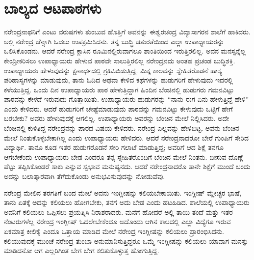 
\chapter{ಬಾಲ್ಯದ ಆಟಪಾಠಗಳು}

ನರೇಂದ್ರನಾಥನಿಗೆ ಎಂಟು ವರುಷಗಳು ತುಂಬುವ ಹೊತ್ತಿಗೆ ಅವನನ್ನು ಈಶ್ವರಚಂದ್ರ ವಿದ್ಯಾಸಾಗರನ ಶಾಲೆಗೆ ಹಾಕಿದರು. ಅಲ್ಲಿ ನರೇಂದ್ರ ಚೆನ್ನಾಗಿ ಓದಲು ಉಪಕ್ರಮಿಸಿದನು. ತನ್ನ ಬುದ್ಧಿ ಚತುರತೆಯಿಂದ ಎಲ್ಲಾ ಉಪಾಧ್ಯಾಯರನ್ನು ಒಲಿಸಿಕೊಂಡನು. ಆದರೆ ನರೇಂದ್ರ ಕ್ಲಾಸಿನ ರೂಮಿನಲ್ಲಿರುವಾಗಲೂ ಶಾಂತಿಯಿಂದ ಇರುತ್ತಿರಲಿಲ್ಲ. ಅವನ ಮನಸ್ಸನ್ನೆಲ್ಲ ಕೇಂದ್ರೀಕರಿಸಲು ಉಪಾಧ್ಯಾಯರು ಹೇಳುವ ಪಾಠವೇ ಸಾಲುತ್ತಿರಲಿಲ್ಲ ನರೇಂದ್ರನದು ಅಂತಹ ಪ್ರಚಂಡ ಬುದ್ಧಿಶಕ್ತಿ. ಉಪಾಧ್ಯಾಯರು ಹೇಳುವುದನ್ನು ಕ್ಷಣಾರ್ಧದಲ್ಲಿ ಗ್ರಹಿಸಿಬಿಡುತ್ತಿದ್ದ. ಮಿಕ್ಕ ಕಾಲವನ್ನು ಸ್ನೇಹಿತರೊಡನೆ ಹಾಸ್ಯ ಪರಿಹಾಸ್ಯಗಳನ್ನು ಮಾಡುವುದು, ತಾನು ಓದಿದ ಅಥವಾ ಕೇಳಿದ ಕಥೆಗಳನ್ನು ಹುಡುಗರಿಗೆ ಹೇಳುವುದು ಇದರಲ್ಲಿ ಕಳೆಯುತ್ತಿದ್ದ. ಒಂದು ದಿನ ಉಪಾಧ್ಯಾಯರು ಪಾಠ ಹೇಳುತ್ತಿದ್ದಾಗ ಹಿಂದಿನ ಬೆಂಚಿನಲ್ಲಿ ಹುಡುಗರು ಗಮನವಿಟ್ಟು ಪಾಠವನ್ನು ಕೇಳದೆ ಇರುವುದು ಗೊತ್ತಾಯಿತು. ಉಪಾಧ್ಯಾಯರು ಹುಡುಗರನ್ನು “ನಾನು ಈಗ ಏನು ಹೇಳುತ್ತಿದ್ದೆ ಹೇಳಿ” ಎಂದು ಕೇಳಿದರು. ಆದರೆ ಹುಡುಗರಿಗೆ ಚೇಷ್ಟೆಮಾಡುವುದು ಪಾಠವನ್ನು ಗಮನವಿಟ್ಟು ಕೇಳುವುದು ಒಟ್ಟಿಗೆ ಹೇಗೆ ಬರಬೇಕು? ಅವರು ಹೇಳುವುದಕ್ಕೆ ಆಗಲಿಲ್ಲ. ಉಪಾಧ್ಯಾಯರು ಅವರನ್ನು ಬೆಂಚಿನ ಮೇಲೆ ನಿಲ್ಲಿಸಿದರು. ಅದೇ ಬೆಂಚಿನಲ್ಲಿ ಕುಳಿತಿದ್ದ ನರೇಂದ್ರನನ್ನು ಪಾಠದ ವಿಷಯ ಕೇಳಿದರು. ನರೇಂದ್ರ ಎಲ್ಲವನ್ನು ಹೇಳಿಬಿಟ್ಟ. ಅವನು ಬೆಂಚಿನ ಮೇಲೆ ನಿಂತುಕೊಳ್ಳಬೇಕಾಗಿಲ್ಲ ಎಂದು ಉಪಾಧ್ಯಾಯರು ಹೇಳಿದರು. ಆದರೆ ನರೇಂದ್ರನಾದರೋ ಬೇರೆ ಗುಂಪಿಗೆ ಸೇರಿದ ವಿದ್ಯಾರ್ಥಿ. ತಾನೂ ಕೂಡ ಇತರ ಹುಡುಗರೊಡನೆ ಸೇರಿ ಗಲಾಟೆ ಮಾಡುತ್ತಿದ್ದ; ಅವರಿಗೆ ಆದ ಶಿಕ್ಷೆ ತನಗೂ ಆಗಬೇಕೆಂದು ಉಪಾಧ್ಯಾಯರು ಬೇಡ ಎಂದರೂ ತನ್ನ ಸ್ನೇಹಿತರೊಂದಿಗೆ ಬೆಂಚಿನ ಮೇಲೆ ನಿಂತನು. ಬೀಸುವ ದೊಣ್ಣೆ ಪೆಟ್ಟು ತಪ್ಪಿಸಿಕೊಂಡರೆ ಸಾಕು ಎನ್ನುವ ಸ್ವಭಾವ ಮನುಷ್ಯನದು. ಆದರೆ ನರೇಂದ್ರನಾದರೊ ತಾನೇ ಶಿಕ್ಷೆಗೆ ಮುಂದೆ ಬಂದು ಅದನ್ನು ಬಲಾತ್ಕಾರವಾಗಿ ತೆಗೆದುಕೊಂಡು ಅನುಭವಿಸುವುದನ್ನು ನೋಡುವೆವು.

ನರೇಂದ್ರ ಮೇಲಿನ ತರಗತಿಗೆ ಬಂದ ಮೇಲೆ ಅವನು ಇಂಗ್ಲೀಷನ್ನು ಕಲಿಯಬೇಕಾಯಿತು. ಇಂಗ್ಲೀಷ್ ಮ್ಲೇಚ್ಛರ ಭಾಷೆ, ತಾನು ಏತಕ್ಕೆ ಅದನ್ನು ಕಲಿಯಲು ಹೋಗಬೇಕು, ತನಗೆ ಅದು ಬೇಡ ಎಂದು ಹಟಹಿಡಿದ. ಶಾಲೆಯಲ್ಲಿ ಉಪಾಧ್ಯಾಯರು ಅವನಿಗೆ ಕಲಿಯಲು ಒಪ್ಪಿಸಲು ಪ್ರಯತ್ನಿಸಿ ನಿರಾಶರಾದರು. ಮನೆಗೆ ಹೋದರೆ ಅಲ್ಲಿ ತಾಯಿ ತಂದೆ ಮತ್ತು ಇತರ ನೆಂಟರುಗಳೆಲ್ಲ ನರೇಂದ್ರ ಇಂಗ್ಲೀಷ್ ಓದಲೇಬೇಕೆಂದೂ ಅದೊಂದು ಆಗಿನ ಕಾಲದಲ್ಲಿ ಎಲ್ಲಾ ವಿದ್ಯೆಗೂ ಇರುವ ಏಕಮಾತ್ರ ಕೀಲಿಕೈ ಎಂದೂ ಒತ್ತಾಯ ಮಾಡಿದ ಮೇಲೆ ನರೇಂದ್ರ ಇಂಗ್ಲೀಷನ್ನು ಕಲಿಯಲು ಪ್ರಾರಂಭಿಸಿದನು. ಕಲಿಯುವುದಕ್ಕೆ ಮುಂಚೆ ನರೇಂದ್ರ ತುಂಬಾ ಅನುಮಾನಿಸುತ್ತಿದ್ದರೂ ಒಮ್ಮೆ ಇಂಗ್ಲೀಷನ್ನು ಕಲಿಯಲು ಯಾವಾಗ ಮನಸ್ಸು ಮಾಡಿದನೋ ಆಗ ಎಲ್ಲರಿಗಿಂತ ಬೇಗ ಬೇಗ ಕಲಿತುಕೊಳ್ಳುತ್ತ ಹೋಗುತ್ತಿದ್ದ.

